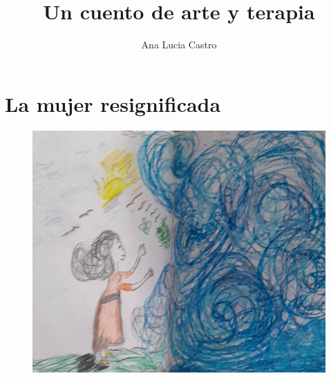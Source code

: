 \documentclass[12pt, a4paper, twoside]{book} %
\author{Ana Lucia Castro}
\title{\textbf{Un cuento de arte y terapia}}
\date{}
\begin{document}
\maketitle
\thispagestyle{empty} %

\tableofcontents

\chapter{La mujer resignificada}

\begin{figure}[H]
	\centering
	\includegraphics[width=\textwidth]{./images/1f81324df3940b.jpg}
\end{figure}

\clearpage
\end{document}
